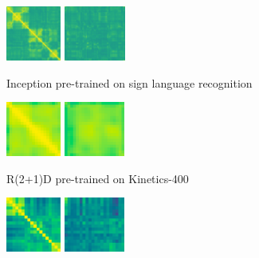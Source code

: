 \documentclass[final]{cvpr}
\begin{document}
\begin{figure}[t]
	\begin{subfigure}[t]{0.5\linewidth}
		\centering\captionsetup{width=.9\linewidth, justification=raggedright}
		\includegraphics[height=1.8cm]{fig/matrices/a_2d}
		\includegraphics[height=1.8cm]{fig/matrices/b_2d}
		\vspace{-0.1\baselineskip}
		\caption{\centering Inception pre-trained on sign language recognition}
	\end{subfigure}\hfill
	\begin{subfigure}[t]{0.5\linewidth}
		\centering\captionsetup{width=.9\linewidth, justification=raggedright}
		\includegraphics[height=1.8cm]{fig/matrices/a_kinetics}
		\includegraphics[height=1.8cm]{fig/matrices/b_kinetics}
		\vspace{-0.1\baselineskip}
		\caption{\centering R(2+1)D pre-trained on Kinetics-400}
	\end{subfigure}
	\par\medskip
	\begin{subfigure}[t]{0.5\linewidth}
		\centering\captionsetup{width=.9\linewidth, justification=raggedright}
		\includegraphics[height=1.8cm]{fig/matrices/a_tarrow}
		\includegraphics[height=1.8cm]{fig/matrices/b_tarrow}

\end{subfigure}
\end{figure}
\end{document}
